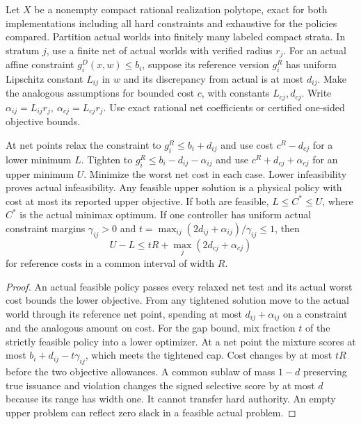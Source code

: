\begin{theorem}\label{adv:ug2}
Let \(X\) be a nonempty compact rational realization polytope, exact for both implementations including all hard constraints and exhaustive for the policies compared. Partition actual worlds into finitely many labeled compact strata. In stratum \(j\), use a finite net of actual worlds with verified radius \(r_j\). For an actual affine constraint \(g_i^D(x,w)\le b_i\), suppose its reference version \(g_i^R\) has uniform Lipschitz constant \(L_{ij}\) in \(w\) and its discrepancy from actual is at most \(d_{ij}\). Make the analogous assumptions for bounded cost \(c\), with constants \(L_{cj},d_{cj}\). Write \(\alpha_{ij}=L_{ij}r_j,\ \alpha_{cj}=L_{cj}r_j\). Use exact rational net coefficients or certified one-sided objective bounds.

At net points relax the constraint to \(g_i^R\le b_i+d_{ij}\) and use cost \(c^R-d_{cj}\) for a lower minimum \(L\). Tighten to \(g_i^R\le b_i-d_{ij}-\alpha_{ij}\) and use \(c^R+d_{cj}+\alpha_{cj}\) for an upper minimum \(U\). Minimize the worst net cost in each case. Lower infeasibility proves actual infeasibility. Any feasible upper solution is a physical policy with cost at most its reported upper objective. If both are feasible, \(L\le C^*\le U\), where \(C^*\) is the actual minimax optimum. If one controller has uniform actual constraint margins \(\gamma_{ij}>0\) and \(t=\max_{ij}(2d_{ij}+\alpha_{ij})/\gamma_{ij}\le1\), then
\[
 U-L\le tR+\max_j(2d_{cj}+\alpha_{cj})
\]
for reference costs in a common interval of width \(R\).
\end{theorem}
\begin{proof}
An actual feasible policy passes every relaxed net test and its actual worst cost bounds the lower objective. From any tightened solution move to the actual world through its reference net point, spending at most \(d_{ij}+\alpha_{ij}\) on a constraint and the analogous amount on cost. For the gap bound, mix fraction \(t\) of the strictly feasible policy into a lower optimizer. At a net point the mixture scores at most \(b_i+d_{ij}-t\gamma_{ij}\), which meets the tightened cap. Cost changes by at most \(tR\) before the two objective allowances. A common sublaw of mass \(1-d\) preserving true issuance and violation changes the signed selective score by at most \(d\) because its range has width one. It cannot transfer hard authority. An empty upper problem can reflect zero slack in a feasible actual problem.
\end{proof}


